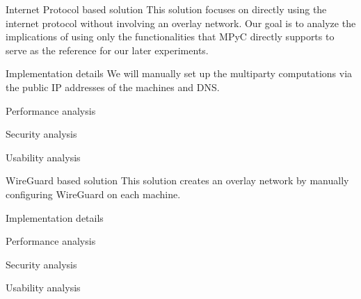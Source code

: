 \label{thesis__050-internet-protocol.md}
\begin{block}{Internet Protocol based solution}
\label{thesis__050-internet-protocol.md__internet-protocol-based-solution}
This solution focuses on directly using the internet protocol without involving an overlay network. Our goal is to analyze the implications of using only the functionalities that MPyC directly supports to serve as the reference for our later experiments.

\begin{block}{Implementation details}
\label{thesis__050-internet-protocol.md__implementation-details}
We will manually set up the multiparty computations via the public IP addresses of the machines and DNS.
\end{block}

\begin{block}{Performance analysis}
\label{thesis__050-internet-protocol.md__performance-analysis}
\end{block}

\begin{block}{Security analysis}
\label{thesis__050-internet-protocol.md__security-analysis}
\end{block}

\begin{block}{Usability analysis}
\label{thesis__050-internet-protocol.md__usability-analysis}
\end{block}
\end{block}

\label{thesis__060-wireguard.md}
\begin{block}{WireGuard based solution}
\label{thesis__060-wireguard.md__wireguard-based-solution}
This solution creates an overlay network by manually configuring WireGuard on each machine.

\begin{block}{Implementation details}
\label{thesis__060-wireguard.md__implementation-details}
\end{block}

\begin{block}{Performance analysis}
\label{thesis__060-wireguard.md__performance-analysis}
\end{block}

\begin{block}{Security analysis}
\label{thesis__060-wireguard.md__security-analysis}
\end{block}

\begin{block}{Usability analysis}
\label{thesis__060-wireguard.md__usability-analysis}
\end{block}
\end{block}

